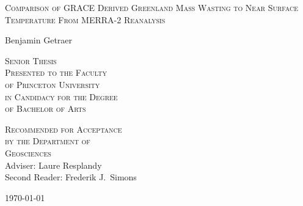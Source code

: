 \thispagestyle{empty}
  \begin{center}
    \textsc{\LARGE Comparison of GRACE Derived Greenland Mass Wasting to Near Surface Temperature From MERRA-2 Reanalysis} 
  \end{center}
  \vspace{.6in}
  \begin{center}
    Benjamin Getraer 
  \end{center}
  \vspace{.6in}
  \begin{center}
    \textsc{Senior Thesis \\ 
    Presented to the Faculty \\
    of Princeton University \\
    in Candidacy for the Degree \\
    of Bachelor of Arts}
  \end{center}
  \vspace{.3in}
  \begin{center}
    \textsc{Recommended for Acceptance \\
    by the Department of \\
    Geosciences \\}
    Adviser: Laure Resplandy \\
    Second Reader: Frederik J.~Simons \\
  \end{center}
  \vspace{.3in}
  \begin{center}
\today
  \end{center}
  
  \clearpage
